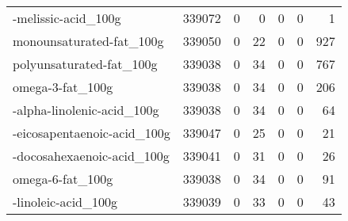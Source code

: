 \begin{tabular}{lrrrrrr}
-melissic-acid\_100g                        &                                        339072 &                                         0 &                                             0 &                                         0 &                      0 &                1 \\
monounsaturated-fat\_100g                   &                                        339050 &                                         0 &                                            22 &                                         0 &                      0 &              927 \\
polyunsaturated-fat\_100g                   &                                        339038 &                                         0 &                                            34 &                                         0 &                      0 &              767 \\
omega-3-fat\_100g                           &                                        339038 &                                         0 &                                            34 &                                         0 &                      0 &              206 \\
-alpha-linolenic-acid\_100g                 &                                        339038 &                                         0 &                                            34 &                                         0 &                      0 &               64 \\
-eicosapentaenoic-acid\_100g                &                                        339047 &                                         0 &                                            25 &                                         0 &                      0 &               21 \\
-docosahexaenoic-acid\_100g                 &                                        339041 &                                         0 &                                            31 &                                         0 &                      0 &               26 \\
omega-6-fat\_100g                           &                                        339038 &                                         0 &                                            34 &                                         0 &                      0 &               91 \\
-linoleic-acid\_100g                        &                                        339039 &                                         0 &                                            33 &                                         0 &                      0 &               43 \\

\end{tabular}
